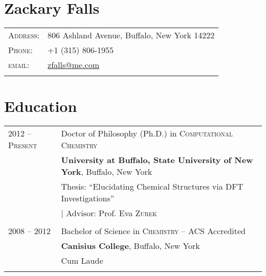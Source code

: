 \documentclass[letterpaper,10pt]{article} %
\begin{document}
\pagestyle{empty} %


\section{\Huge \textbf{ Zackary Falls}}
\noindent 
\begin{tabular}{R{1.7cm}l}

\textsc{Address:} & 806 Ashland Avenue, Buffalo, New York 14222 \\
\textsc{Phone:} & +1 (315) 806-1955\\
\textsc{email:} & \href{mailto:zfalls@me.com}{zfalls@me.com} \\
 \\

\end{tabular}




\section{Education}
\noindent 
\begin{tabular}{R{3cm}|p{13cm}} 

\textsc{2012 -- Present} & Doctor of Philosophy (Ph.D.) in \textsc{Computational Chemistry} \\ 
& \textbf{University at Buffalo, State University of New York}, Buffalo, New York \\
& \hspace{3mm} \small Thesis: ``Elucidating Chemical Structures via DFT Investigations'' \\
& \hspace{3mm} \small | Advisor: Prof. Eva \textsc{Zurek} \\
 \\


\textsc{2008 -- 2012} & Bachelor of Science in \textsc{}\textsc{Chemistry} -- ACS Accredited \\
& \normalsize\textbf{Canisius College}, Buffalo, New York\\
& \hspace{3mm} \small Cum Laude\\
 \\

\end{tabular}
\end{document}
